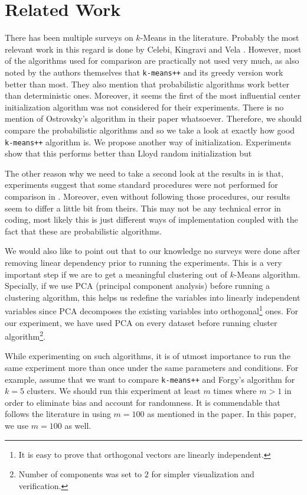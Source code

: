 \documentclass[10pt, leqno]{article}
\begin{document}
	\section{Related Work}
	There has been multiple surveys on $k$-Means in the literature. Probably the most relevant work in this regard is done by Celebi, Kingravi and Vela \cite{celebi}. However, most of the algorithms used for comparison are practically not used very much, as also noted by the authors themselves that \texttt{k-means++} and its greedy version work better than most. They also mention that probabilistic algorithms work better than deterministic ones. Moreover, it seems the first of the most influential center initialization algorithm \cite{ostrovsky} was not considered for their experiments. There is no mention of Ostrovsky's algorithm in their paper whatsoever. Therefore, we should compare the probabilistic algorithms and so we take a look at exactly how good \texttt{k-means++} algorithm is. We propose another way of initialization. Experiments show that this performs better than Lloyd random initialization but 
	
	The other reason why we need to take a second look at the results in \cite{kmeans++} is that, experiments suggest that some standard procedures were not performed for comparison in \cite{kmeans++}. Moreover, even without following those procedures, our results seem to differ a little bit from theirs. This may not be any technical error in coding, most likely this is just different ways of implementation coupled with the fact that these are probabilistic algorithms.
	
	We would also like to point out that to our knowledge no surveys were done after removing linear dependency prior to running the experiments. This is a very important step if we are to get a meaningful clustering out of $k$-Means algorithm. Specially, if we use PCA (principal component analysis) before running a clustering algorithm, this helps us redefine the variables into linearly independent variables since PCA decomposes the existing variables into orthogonal\footnote{It is easy to prove that orthogonal vectors are linearly independent.} ones. For our experiment, we have used PCA on every dataset before running cluster algorithm\footnote{Number of components was set to $2$ for simpler visualization and verification.}.
	
	While experimenting on such algorithms, it is of utmost importance to run the same experiment more than once under the same parameters and conditions. For example, assume that we want to compare \texttt{k-means++} and Forgy's algorithm \cite{forgy} for $k=5$ clusters. We should run this experiment at least $m$ times where $m>1$ in order to eliminate bias and account for randomness. It is commendable that \cite{celebi} follows the literature in using $m=100$ as mentioned in the paper. In this paper, we use $m=100$ as well.
	
\end{document}
